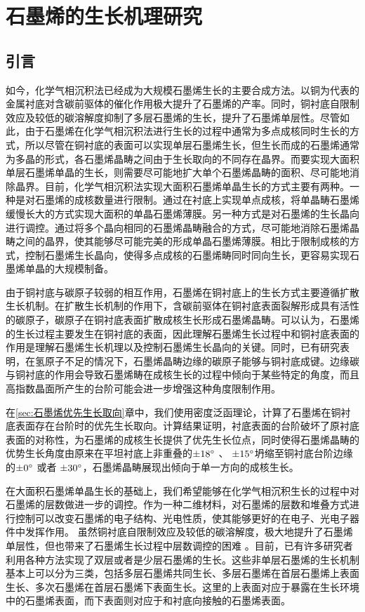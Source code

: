 \def\CCluster#1{\rm{C_{#1}}}
\chapter{石墨烯的生长机理研究}
\label{cap:石墨烯的生长机理研究}
\section{引言}
如今，化学气相沉积法已经成为大规模石墨烯生长的主要合成方法。以铜为代表的金属衬底对含碳前驱体的催化作用极大提升了石墨烯的产率。同时，铜衬底自限制效应及较低的碳溶解度抑制了多层石墨烯的生长，提升了石墨烯单层性。尽管如此，由于石墨烯在化学气相沉积法进行生长的过程中通常为多点成核同时生长的方式，所以尽管在铜衬底的表面可以实现单层石墨烯生长，但生长而成的石墨烯通常为多晶的形式，各石墨烯晶畴之间由于生长取向的不同存在晶界。而要实现大面积单层石墨烯单晶的生长，则需要尽可能地扩大单个石墨烯晶畴的面积、尽可能地消除晶界。目前，化学气相沉积法实现大面积石墨烯单晶生长的方式主要有两种。一种是对石墨烯的成核数量进行限制。通过在衬底上实现单点成核，将单晶畴石墨烯缓慢长大的方式实现大面积的单晶石墨烯薄膜。另一种方式是对石墨烯的生长晶向进行调控。通过将多个晶向相同的石墨烯晶畴融合的方式，尽可能地消除石墨烯晶畴之间的晶界，使其能够尽可能完美的形成单晶石墨烯薄膜。相比于限制成核的方式，控制石墨烯生长晶向，使得多点成核的石墨烯畴同时同向生长，更容易实现石墨烯单晶的大规模制备。%

由于铜衬底与碳原子较弱的相互作用，石墨烯在铜衬底上的生长方式主要遵循扩散生长机制。在扩散生长机制的作用下，含碳前驱体在铜衬底表面裂解形成具有活性的碳原子，碳原子在铜衬底表面扩散成核生长形成石墨烯晶畴。可以认为，石墨烯的生长过程主要发生在铜衬底的表面，因此理解石墨烯生长过程中和铜衬底表面的作用是理解石墨烯生长机理以及控制石墨烯生长晶向的关键。同时，已有研究表明，在氢原子不足的情况下，石墨烯晶畴边缘的碳原子能够与铜衬底成键。边缘碳与铜衬底的作用会导致石墨烯畴在成核生长的过程中倾向于某些特定的角度，而且高指数晶面所产生的台阶可能会进一步增强这种角度限制作用。%

在\ref{sec:石墨烯优先生长取向}章中，我们使用密度泛函理论，计算了石墨烯在铜衬底表面存在台阶时的优先生长取向。计算结果证明，衬底表面的台阶破坏了原衬底表面的对称性，为石墨烯的成核生长提供了优先生长位点，同时使得石墨烯晶畴的优势生长角度由原来在平坦衬底上非重叠的$\SI{\pm 18}{\degree}$ 、 $\SI{\pm 15}{\degree}$坍缩至铜衬底台阶边缘的$\SI{\pm 0}{\degree}$ 或者 $\SI{\pm 30}{\degree}$，石墨烯晶畴展现出倾向于单一方向的成核生长。

在大面积石墨烯单晶生长的基础上，我们希望能够在化学气相沉积生长的过程中对石墨烯的层数做进一步的调控。作为一种二维材料，对石墨烯的层数和堆叠方式进行控制可以改变石墨烯的电子结构、光电性质，使其能够更好的在电子、光电子器件中发挥作用。
虽然铜衬底自限制效应及较低的碳溶解度，极大地提升了石墨烯单层性，但也带来了石墨烯生长过程中层数调控的困难 。目前，已有许多研究者利用各种方法实现了双层或者是少层石墨烯的生长。这些非单层石墨烯的生长机制基本上可以分为三类，包括多层石墨烯共同生长、多层石墨烯在首层石墨烯上表面生长、多次石墨烯在首层石墨烯下表面生长。这里的上表面对应于暴露在生长环境中的石墨烯表面，而下表面则对应于和衬底向接触的石墨烯表面。%

